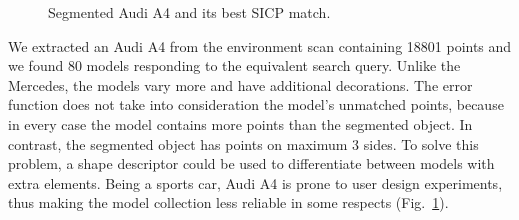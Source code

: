 \documentclass{llncs}
\begin{document}
  \begin{figure}
    \centering
    \hfill
    \hfill
    \caption{Segmented Audi A4 and its best SICP match.}
    \label{audi_trio}
  \end{figure}

We extracted an Audi A4 from the environment scan containing 18801
points and we found 80 models responding to the equivalent search
query. Unlike the Mercedes, the models vary more and have additional
decorations. The error function does not take into consideration the
model's unmatched points, because in every case the model contains
more points than the segmented object. In contrast, the segmented
object has points on maximum 3 sides. To solve this problem, a shape
descriptor could be used to differentiate between models with extra
elements. Being a sports car, Audi A4 is prone to user design
experiments, thus making the model collection less reliable in some
respects (Fig.~\ref{audi_trio}).
\end{document}
